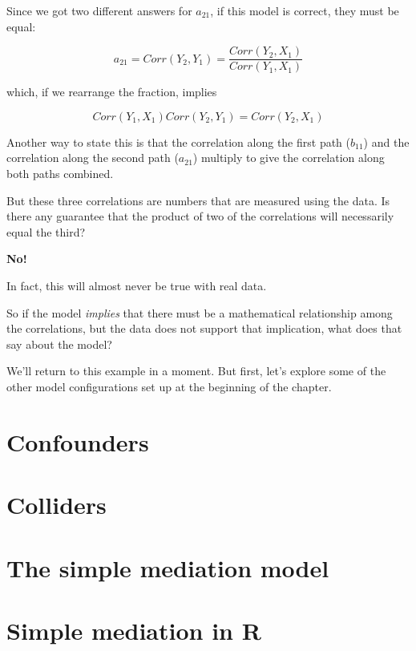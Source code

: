 \documentclass[
]{book}
\begin{document}
Since we got two different answers for \(a_{21}\), if this model is correct, they must be equal:

\[
a_{21} = Corr(Y_{2}, Y_{1}) = \frac{Corr(Y_{2}, X_{1})}{Corr(Y_{1}, X_{1})}
\]

which, if we rearrange the fraction, implies

\[
Corr(Y_{1}, X_{1}) Corr(Y_{2}, Y_{1}) = Corr(Y_{2}, X_{1}) 
\]

Another way to state this is that the correlation along the first path (\(b_{11}\)) and the correlation along the second path (\(a_{21}\)) multiply to give the correlation along both paths combined.

But these three correlations are numbers that are measured using the data. Is there any guarantee that the product of two of the correlations will necessarily equal the third?

\textbf{No!}

In fact, this will almost never be true with real data.

So if the model \emph{implies} that there must be a mathematical relationship among the correlations, but the data does not support that implication, what does that say about the model?

We'll return to this example in a moment. But first, let's explore some of the other model configurations set up at the beginning of the chapter.

\hypertarget{mediation-confounders}{%
\section{Confounders}\label{mediation-confounders}}

\hypertarget{mediation-colliders}{%
\section{Colliders}\label{mediation-colliders}}

\hypertarget{mediation-simple}{%
\section{The simple mediation model}\label{mediation-simple}}

\hypertarget{mediation-r}{%
\section{Simple mediation in R}\label{mediation-r}}
\end{document}
